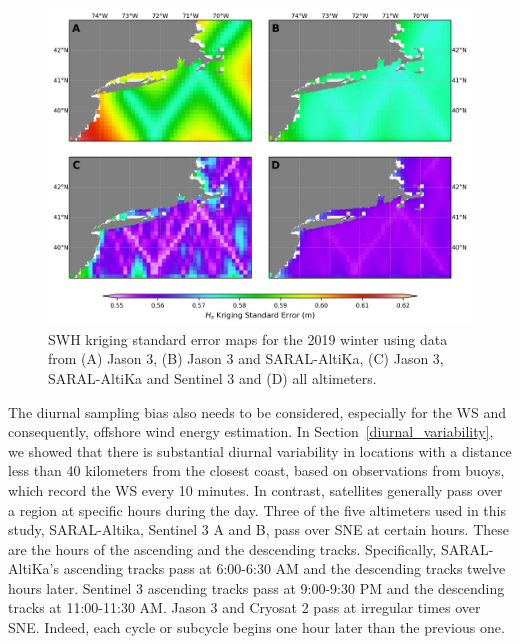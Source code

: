 \begin{figure}[H]
\centering
\includegraphics[width=0.95\linewidth]{Figures/Chapter5/kriging_mapping_error_w19_1.png}
\caption{SWH kriging standard error maps for the 2019 winter using data from (A) Jason 3,  (B) Jason 3 and SARAL-AltiKa, (C) Jason 3, SARAL-AltiKa and Sentinel 3 and (D) all altimeters.}
\label{fig:kriging_error}
\end{figure}


The diurnal sampling bias \cite{Ahsbahs2020, Barthelmie2003} also needs to be considered, especially for the WS and consequently, offshore wind energy estimation. In Section~\ref{diurnal_variability}, we showed that there is substantial diurnal variability in locations with a distance less than 40 kilometers from the closest coast, based on observations from buoys, which record the WS every 10 minutes. In contrast, satellites generally pass over a region at specific hours during the day. Three of the five altimeters used in this study,  SARAL-Altika, Sentinel 3 A and B, pass over SNE at certain hours. These are the hours of the ascending and the descending tracks. Specifically, SARAL-AltiKa's ascending tracks pass at 6:00-6:30 AM and the descending tracks twelve hours later. Sentinel 3 ascending tracks pass at 9:00-9:30 PM and the descending tracks at 11:00-11:30 AM. Jason 3 and Cryosat 2 pass at irregular times over SNE. Indeed, each cycle or subcycle begins one hour later than the previous one. 



